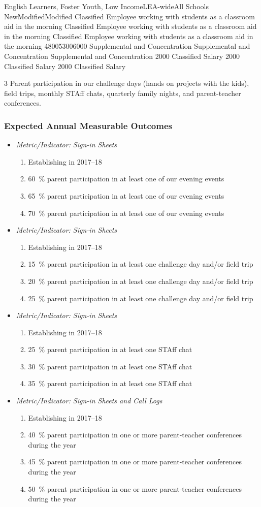 \documentclass{article}
\makeatletter
\newcounter{goal}[section] %
\newcommand*{\expout}[1]{%
	\expandafter\@expout\csname c@#1\endcsname%
}
\newcommand*{\@expout}[1]{%
	$\ifcase\intcalcAdd{1}{\intcalcMod{\intcalcSub{#1}{1}}{4}}
		\or{\text{Baseline:}}
		\or{\text{2017--18:}}
		\or{\text{2018--19:}}
		\or{\text{2019--20:}}
    \else\@ctrerr\fi$
}
\newcommand{\expoutcome}[5]{
	\item
	{\em Metric/Indicator: #1}
	\begin{enumerate}[label=\expout*]
		\setlength\itemindent{40pt}
		\item #2
		\item #3
		\item #4
		\item #5
	\end{enumerate}
}
\newenvironment{expoutcomes}
	{
		\subsubsection{Expected Annual Measurable Outcomes}
		\begin{itemize}[label={}]
	}
	{\end{itemize}}
\newcounter{action}[goal]
\makeatother
\begin{document}
\begin{planactions}
	\planaction@scope
	{English Learners, Foster Youth, Low Income}{LEA-wide}{All Schools}
	\planaction@action
	{New}{Modified}{Modified}
	{Classified Employee working with students as a classroom aid in the morning}
	{Classified Employee working with students as a classroom aid in the morning}
	{Classified Employee working with students as a classroom aid in the morning}
	\planaction@budget
	{4800}{5300}{6000}
	{Supplemental and Concentration}
	{Supplemental and Concentration}
	{Supplemental and Concentration}
	{\num{2000} Classified Salary}
	{\num{2000} Classified Salary}
	{\num{2000} Classified Salary}
\end{planactions}

	{3}
	{}
	{Parent participation in our challenge days (hands on projects with the kids), field trips, monthly STAff chats, quarterly family nights, and parent-teacher conferences.}

\begin{expoutcomes}
	\expoutcome
	{Sign-in Sheets}
	{Establishing in 2017--18}
	{\SI{60}{\percent} parent participation in at least one of our evening events}
	{\SI{65}{\percent} parent participation in at least one of our evening events}
	{\SI{70}{\percent} parent participation in at least one of our evening events}
	\expoutcome
	{Sign-in Sheets}
	{Establishing in 2017--18}
	{\SI{15}{\percent} parent participation in at least one challenge day and/or field trip}
	{\SI{20}{\percent} parent participation in at least one challenge day and/or field trip}
	{\SI{25}{\percent} parent participation in at least one challenge day and/or field trip}
	\expoutcome
	{Sign-in Sheets}
	{Establishing in 2017--18}
	{\SI{25}{\percent} parent participation in at least one STAff chat}
	{\SI{30}{\percent} parent participation in at least one STAff chat}
	{\SI{35}{\percent} parent participation in at least one STAff chat}
	\expoutcome
	{Sign-in Sheets and Call Logs}
	{Establishing in 2017--18}
	{\SI{40}{\percent} parent participation in one or more parent-teacher conferences during the year}
	{\SI{45}{\percent} parent participation in one or more parent-teacher conferences during the year}
	{\SI{50}{\percent} parent participation in one or more parent-teacher conferences during the year}
\end{expoutcomes}
\end{document}
